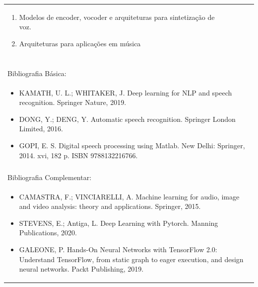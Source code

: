 \documentclass[11pt]{article}
\begin{document}
\begin{center}
\begin{longtable}{|p{4cm}|p{4cm}|p{4cm}|p{4cm}|}
{\begin{enumerate}
\item Modelos de encoder, vocoder e arquiteturas para sintetização de voz.
\item Arquiteturas para aplicações em música\end{enumerate}}\\
\multicolumn{4}{|p{16cm}|}{}\\
\multicolumn{4}{|p{16cm}|}{}\\
\multicolumn{4}{|p{16cm}|}{\vspace{-1cm}}\\
\multicolumn{4}{|p{16cm}|}{}\\
\hline
\multicolumn{4}{|p{16cm}|}{Bibliografia Básica:}\\
\multicolumn{4}{|p{16cm}|}{%
\begin{itemize}\item KAMATH, U. L.; WHITAKER, J. Deep learning for NLP and speech recognition. Springer Nature, 2019.
\item DONG, Y.; DENG, Y. Automatic speech recognition. Springer London Limited, 2016.
\item GOPI, E. S. Digital speech processing using Matlab. New Delhi: Springer, 2014. xvi, 182 p. ISBN 9788132216766.\end{itemize}}\\
\multicolumn{4}{|p{16cm}|}{}\\
\hline
\multicolumn{4}{|p{16cm}|}{Bibliografia Complementar:}\\
\multicolumn{4}{|p{16cm}|}{%
\begin{itemize}\item CAMASTRA, F.; VINCIARELLI, A. Machine learning for audio, image and video analysis: theory and applications. Springer, 2015.
\item STEVENS, E.; Antiga, L. Deep Learning with Pytorch. Manning Publications, 2020.
\item GALEONE, P. Hands-On Neural Networks with TensorFlow 2.0: Understand TensorFlow, from static graph to eager execution, and design neural networks. Packt Publishing, 2019.\end{itemize}}\\
\hline
\end{longtable}
\end{center}
\end{document}
